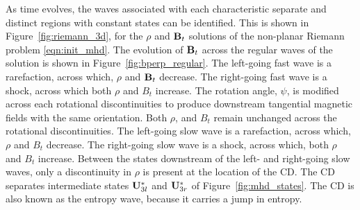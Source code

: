 As time evolves, the waves associated with each characteristic separate and distinct regions with constant states can be identified.  This is shown in Figure~\ref{fig:riemann_3d}, for the $\rho$ and $\mathbf{B}_t$ solutions of the non-planar Riemann problem \eqref{eqn:init_mhd}.  The evolution of $\mathbf{B}_t$ across the regular waves of the solution is shown in Figure~\ref{fig:bperp_regular}.  The left-going fast wave is a rarefaction, across which, $\rho$ and $\mathbf{B}_t$ decrease.  The right-going fast wave is a shock, across which both $\rho$ and $B_t$ increase.  The rotation angle, $\psi$, is modified across each rotational discontinuities to produce downstream tangential magnetic fields with the same orientation.  Both $\rho$, and $B_t$ remain unchanged across the rotational discontinuities.  The left-going slow wave is a rarefaction, across which, $\rho$ and $B_t$ decrease.  The right-going slow wave is a shock, across which, both $\rho$ and $B_t$ increase.  Between the states downstream of the left- and right-going slow waves, only a discontinuity in $\rho$ is present at the location of the CD.  The CD separates intermediate states $\mathbf{U}^*_{3l}$ and ${\mathbf{U}^*_{3r}}$ of Figure~\ref{fig:mhd_states}.  The CD is also known as the entropy wave, because it carries a jump in entropy.  


